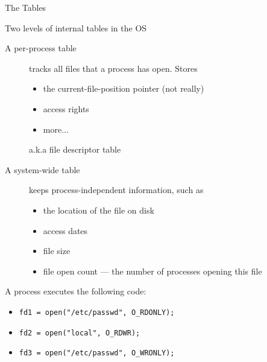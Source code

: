 \begin{frame}{The Tables}%
  \begin{block}{Two levels of internal tables in the OS}
    \begin{description}
      \item[A per-process table] tracks all files that a process has open. Stores
        \begin{itemize}
        \item the current-file-position pointer (not really)
        \item access rights
        \item more...
        \end{itemize}
        a.k.a file descriptor table
      \item[A system-wide table] keeps process-independent information, such as
        \begin{itemize}
        \item the location of the file on disk
        \item access dates
        \item file size
        \item file open count --- the number of processes opening this file
        \end{itemize}
    \end{description}    
  \end{block}  
\end{frame}

\begin{frame}%
  \begin{center}
  \end{center}
\end{frame}

\begin{frame}
  \begin{block}{A process executes the following code:}
    \begin{itemize}
    \item[] \texttt{fd1 = open("/etc/passwd", O\_RDONLY);}
    \item[] \texttt{fd2 = open("local", O\_RDWR);}
    \item[] \texttt{fd3 = open("/etc/passwd", O\_WRONLY);}
    \end{itemize}
  \end{block}
  \begin{center}
  \end{center}
\end{frame}

